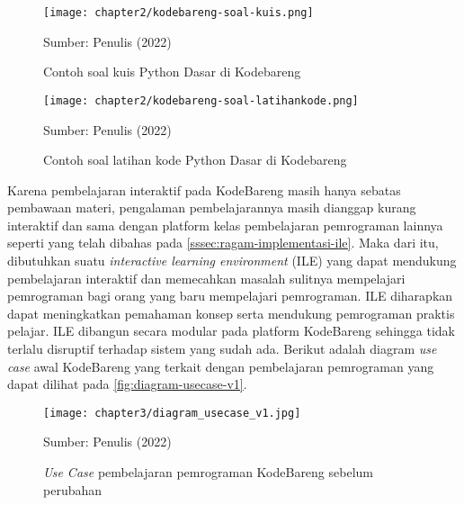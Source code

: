 \begin{figure}[H]
  \centering
  \texttt{[image: chapter2/kodebareng-soal-kuis.png]}
  \caption{Contoh soal kuis Python Dasar di Kodebareng}\label{fig:kodebareng-soal-kuis}
  Sumber: Penulis (2022)
\end{figure}

\begin{figure}[H]
  \centering
  \texttt{[image: chapter2/kodebareng-soal-latihankode.png]}
  \caption{Contoh soal latihan kode Python Dasar di Kodebareng}\label{fig:kodebareng-soal-latihankode}
  Sumber: Penulis (2022)
\end{figure}

Karena pembelajaran interaktif pada KodeBareng masih hanya sebatas pembawaan materi, pengalaman pembelajarannya masih dianggap kurang interaktif dan sama dengan platform kelas pembelajaran pemrograman lainnya seperti yang telah dibahas pada \autoref{sssec:ragam-implementasi-ile}. Maka dari itu, dibutuhkan suatu \textit{interactive learning environment} (ILE) yang dapat mendukung pembelajaran interaktif dan memecahkan masalah sulitnya mempelajari pemrograman bagi orang yang baru mempelajari pemrograman. ILE diharapkan dapat meningkatkan pemahaman konsep serta mendukung pemrograman praktis pelajar. ILE dibangun secara modular pada platform KodeBareng sehingga tidak terlalu disruptif terhadap sistem yang sudah ada. Berikut adalah diagram \textit{use case} awal KodeBareng yang terkait dengan pembelajaran pemrograman yang dapat dilihat pada \autoref{fig:diagram-usecase-v1}.

\begin{figure}[H]
  \centering
  \texttt{[image: chapter3/diagram\_usecase\_v1.jpg]}
  \caption{\textit{Use Case} pembelajaran pemrograman KodeBareng sebelum perubahan} \label{fig:diagram-usecase-v1}
  Sumber: Penulis (2022)
\end{figure}